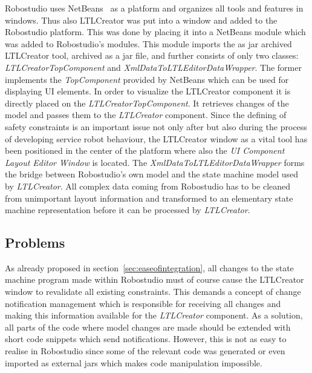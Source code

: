 Robostudio uses NetBeans~\cite{netbeans} as a platform and organizes all tools and features in windows. Thus also LTLCreator was put into a window and added to the Robostudio platform. This was done by placing it into a NetBeans module which was added to Robostudio's modules. This module imports the as jar archived LTLCreator tool, archived as a jar file, and further consists of only two classes: \emph{LTLCreatorTopComponent} and \emph{XmlDataToLTLEditorDataWrapper}. The former implements the \emph{TopComponent} provided by NetBeans which can be used for displaying UI elements. In order to visualize the LTLCreator component it is directly placed on the \emph{LTLCreatorTopComponent}. It retrieves changes of the model and passes them to the \emph{LTLCreator} component. Since the defining of safety constraints is an important issue not only after but also during the process of developing service robot behaviour, the LTLCreator window as a vital tool has been positioned in the center of the platform where also the \emph{UI Component Layout Editor Window} is located.
The \emph{XmlDataToLTLEditorDataWrapper} forms the bridge between Robostudio's own model and the state machine model used by \emph{LTLCreator}. All complex data coming from Robostudio has to be cleaned from unimportant layout information and transformed to an elementary state machine representation before it can be processed by \emph{LTLCreator}.






\subsection{Problems}

As already proposed in section~\ref{sec:easeofintegration}, all changes to the state machine program made within Robostudio must of course cause the LTLCreator window to revalidate all existing constraints. This demands a concept of change notification management which is responsible for receiving all changes and making this information available for the \emph{LTLCreator} component. As a solution, all parts of the code where model changes are made should be extended with short code snippets which send notifications.
However, this is not as easy to realise in Robostudio since some of the relevant code was generated or even imported as external jars which makes code manipulation impossible.

